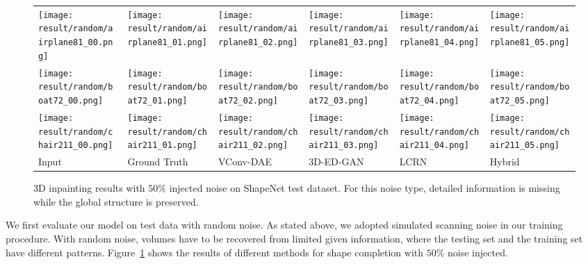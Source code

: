 \documentclass[10pt,twocolumn,letterpaper]{article}
\begin{document}
\begin{figure}[tb]
\centering

    \setlength{\tabcolsep}{0.1em}
\renewcommand{\arraystretch}{0} %
    \begin{tabular}{CCCCCC}
\texttt{[image: result/random/airplane81\_00.png]}
&\texttt{[image: result/random/airplane81\_01.png]}
&\texttt{[image: result/random/airplane81\_02.png]}
&\texttt{[image: result/random/airplane81\_03.png]}
&\texttt{[image: result/random/airplane81\_04.png]}
&\texttt{[image: result/random/airplane81\_05.png]}
\\
\texttt{[image: result/random/boat72\_00.png]}
&\texttt{[image: result/random/boat72\_01.png]}
&\texttt{[image: result/random/boat72\_02.png]}
&\texttt{[image: result/random/boat72\_03.png]}
&\texttt{[image: result/random/boat72\_04.png]}
&\texttt{[image: result/random/boat72\_05.png]}
\\
\texttt{[image: result/random/chair211\_00.png]}

&\texttt{[image: result/random/chair211\_01.png]}

&\texttt{[image: result/random/chair211\_02.png]}

&\texttt{[image: result/random/chair211\_03.png]}

&\texttt{[image: result/random/chair211\_04.png]}

&\texttt{[image: result/random/chair211\_05.png]}

\\

\scriptsize Input &

\scriptsize  Ground Truth & \scriptsize VConv-DAE & \scriptsize 3D-ED-GAN & \scriptsize LCRN & \scriptsize Hybrid
    \end{tabular}
    \caption{3D inpainting results with $50\%$ injected noise on ShapeNet test dataset. For this noise type, detailed information is missing while the global structure is preserved.}
\label{fig:randomcompletion}
\end{figure}

We first evaluate our model on test data with random noise. As stated above, we adopted simulated scanning noise in our training procedure. With random noise, volumes have to be recovered from limited given information, where the testing set and the training set have different patterns. Figure~\ref{fig:randomcompletion} shows the results of different methods for shape completion with $50\%$ noise injected.
\end{document}
